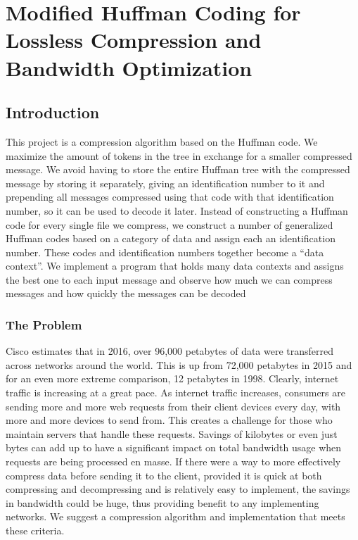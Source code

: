 

\chapter{Modified Huffman Coding for Lossless Compression and Bandwidth Optimization}
\section{Introduction}
This project is a compression algorithm based on the Huffman code. We maximize the amount of tokens in the tree in exchange for a smaller compressed message. We avoid having to store the entire Huffman tree with the compressed message by storing it separately, giving an identification number to it and prepending all messages compressed using that code with that identification number, so it can be used to decode it later. Instead of constructing a Huffman code for every single file we compress, we construct a number of generalized Huffman codes based on a category of data and assign each an identification number. These codes and identification numbers together become a ``data context''. We implement a program that holds many data contexts and assigns the best one to each input message and observe how much we can compress messages and how quickly the messages can be decoded

\subsection{The Problem}
Cisco estimates that in 2016, over 96,000 petabytes of data were transferred across networks around the world.\cite{cisco} This is up from 72,000 petabytes in 2015 and for an even more extreme comparison, 12 petabytes in 1998. Clearly, internet traffic is increasing at a great pace. As internet traffic increases, consumers are sending more and more web requests from their client devices every day, with more and more devices to send from. This creates a challenge for those who maintain servers that handle these requests. Savings of kilobytes or even just bytes can add up to have a significant impact on total bandwidth usage when requests are being processed en masse. If there were a way to more effectively compress data before sending it to the client, provided it is quick at both compressing and decompressing and is relatively easy to implement, the savings in bandwidth could be huge, thus providing benefit to any implementing networks. We suggest a compression algorithm and implementation that meets these criteria. 

